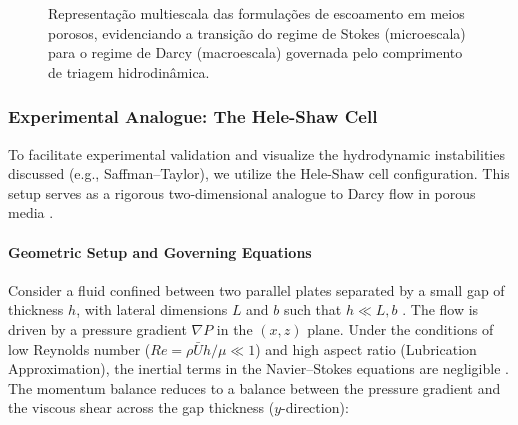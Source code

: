 \begin{figure}[H]
    \centering
    \caption{Representação multiescala das formulações de escoamento em meios porosos, evidenciando a transição do regime de Stokes (microescala) para o regime de Darcy (macroescala) governada pelo comprimento de triagem hidrodinâmica.}
    \label{fig:multiscale-stokes-brinkman-darcy}
\end{figure}

\subsubsection{Experimental Analogue: The Hele-Shaw Cell}

To facilitate experimental validation and visualize the hydrodynamic instabilities discussed (e.g., Saffman--Taylor), we utilize the Hele-Shaw cell configuration.
This setup serves as a rigorous two-dimensional analogue to Darcy flow in porous media \cite{saffman1958penetration}.

\paragraph{Geometric Setup and Governing Equations}
Consider a fluid confined between two parallel plates separated by a small gap of thickness $h$, with lateral dimensions $L$ and $b$ such that $h \ll L, b$ \cite{batchelor1967introduction}.
The flow is driven by a pressure gradient $\nabla P$ in the $(x, z)$ plane.
Under the conditions of low Reynolds number ($Re = \rho \bar{U} h / \mu \ll 1$) and high aspect ratio (Lubrication Approximation), the inertial terms in the Navier--Stokes equations are negligible \cite{bear1972dynamics}.
The momentum balance reduces to a balance between the pressure gradient and the viscous shear across the gap thickness ($y$-direction):

